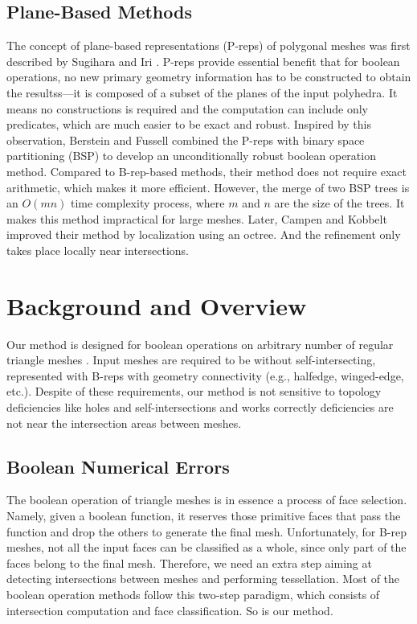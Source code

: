 \documentclass[10pt,journal,compsoc]{IEEEtran}
\begin{document}
\subsection{Plane-Based Methods}
\label{sec:pbrelated}

The concept of plane-based representations (P-reps) of polygonal meshes was first described by Sugihara and Iri \cite{sugihara1990solid}. P-reps provide essential benefit that for boolean operations, no new primary geometry information has to be constructed to obtain the resultss---it is composed of a subset of the planes of the input polyhedra. It means no constructions is required and the computation can include only predicates, which are much easier to be exact and robust. Inspired by this observation, Berstein and Fussell \cite{bernstein2009fast} combined the P-reps with binary space partitioning (BSP) \cite{thibault1987set,naylor1990merging} to develop an unconditionally robust boolean operation method. Compared to B-rep-based methods, their method does not require exact arithmetic, which makes it more efficient. However, the merge of two BSP trees is an $O(mn)$ time complexity process, where $m$ and $n$ are the size of the trees. It makes this method impractical for large meshes. Later, Campen and Kobbelt \cite{campen2010exact} improved their method by localization using an octree. And the refinement only takes place locally near intersections.


\section{Background and Overview}

\label{sec:overview}
Our method is designed for boolean operations on arbitrary number of regular triangle meshes \cite{requicha1985boolean}. Input meshes are required to be without self-intersecting, represented with B-reps with geometry connectivity (e.g., halfedge, winged-edge, etc.). Despite of these requirements, our method is not sensitive to topology deficiencies like holes and self-intersections and works correctly deficiencies are not near the intersection areas between meshes.


\subsection{Boolean Numerical Errors}
\label{sec:paradigm}

The boolean operation of triangle meshes is in essence a process of face selection. Namely, given a boolean function, it reserves those primitive faces that pass the function and drop the others to generate the final mesh. Unfortunately, for B-rep meshes, not all the input faces can be classified as a whole, since only part of the faces belong to the final mesh. Therefore, we need an extra step aiming at detecting intersections between meshes and performing tessellation. Most of the boolean operation methods follow this two-step paradigm, which consists of intersection computation and face classification. So is our method.
\end{document}
